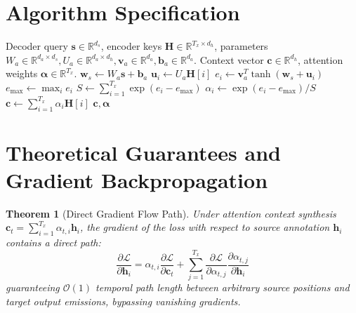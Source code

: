 \documentclass[11pt,a4paper]{article}
\newtheorem{theorem}{Theorem}
\theoremstyle{definition}
\begin{document}
\section{Algorithm Specification}

\begin{algorithm}[H]
\caption{Bahdanau Additive Attention Context Synthesis}
\label{alg:bahdanau}
\begin{algorithmic}[1]
\Require Decoder query $\mathbf{s} \in \mathbb{R}^{d_s}$, encoder keys $\mathbf{H} \in \mathbb{R}^{T_x \times d_h}$, parameters $W_a \in \mathbb{R}^{d_a \times d_s}, U_a \in \mathbb{R}^{d_a \times d_h}, \mathbf{v}_a \in \mathbb{R}^{d_a}, \mathbf{b}_a \in \mathbb{R}^{d_a}$.
\Ensure Context vector $\mathbf{c} \in \mathbb{R}^{d_h}$, attention weights $\boldsymbol{\alpha} \in \mathbb{R}^{T_x}$.
\State $\mathbf{w}_s \gets W_a \mathbf{s} + \mathbf{b}_a$
    \State $\mathbf{u}_i \gets U_a \mathbf{H}[i]$
    \State $e_i \gets \mathbf{v}_a^T \tanh(\mathbf{w}_s + \mathbf{u}_i)$
\EndFor
\State $e_{\max} \gets \max_i e_i$
\State $S \gets \sum_{i=1}^{T_x} \exp(e_i - e_{\max})$
    \State $\alpha_i \gets \exp(e_i - e_{\max}) / S$
\EndFor
\State $\mathbf{c} \gets \sum_{i=1}^{T_x} \alpha_i \mathbf{H}[i]$
\State \Return $\mathbf{c}, \boldsymbol{\alpha}$
\end{algorithmic}
\end{algorithm}

\section{Theoretical Guarantees and Gradient Backpropagation}

\begin{theorem}[Direct Gradient Flow Path]
\label{thm:attention_gradient}
Under attention context synthesis $\mathbf{c}_t = \sum_{i=1}^{T_x} \alpha_{t, i} \mathbf{h}_i$, the gradient of the loss with respect to source annotation $\mathbf{h}_i$ contains a direct path:
\begin{equation}
\frac{\partial \mathcal{L}}{\partial \mathbf{h}_i} = \alpha_{t, i} \frac{\partial \mathcal{L}}{\partial \mathbf{c}_t} + \sum_{j=1}^{T_x} \frac{\partial \mathcal{L}}{\partial \alpha_{t, j}} \frac{\partial \alpha_{t, j}}{\partial \mathbf{h}_i}
\end{equation}
guaranteeing $\mathcal{O}(1)$ temporal path length between arbitrary source positions and target output emissions, bypassing vanishing gradients.
\end{theorem}
\end{document}

